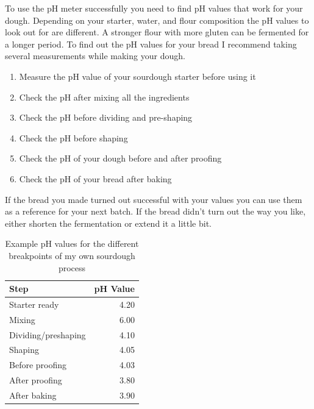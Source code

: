 To use the pH meter successfully you need to find pH values
that work for your dough. Depending on your starter,
water, and flour composition the pH values to look out
for are different. A stronger flour with more gluten
can be fermented for a longer period. To find out
the pH values for your bread I recommend taking
several measurements while making your dough.

\begin{enumerate}
  \item Measure the pH value of your sourdough starter before using it
  \item Check the pH after mixing all the ingredients
  \item Check the pH before dividing and pre-shaping
  \item Check the pH before shaping
  \item Check the pH of your dough before and after proofing
  \item Check the pH of your bread after baking
\end{enumerate}

If the bread you made turned out successful with your values
you can use them as a reference for your next batch. If the
bread didn't turn out the way you like, either shorten
the fermentation or extend it a little bit.

\begin{table}[!htb]
  \begin{tabular}{|l|r|}
  \hline
  \textbf{Step}       & \multicolumn{1}{l|}{\textbf{pH Value}} \\ \hline
  Starter ready       & 4.20                                   \\ \hline
  Mixing              & 6.00                                   \\ \hline
  Dividing/preshaping & 4.10                                   \\ \hline
  Shaping             & 4.05                                   \\ \hline
  Before proofing     & 4.03                                   \\ \hline
  After proofing      & 3.80                                   \\ \hline
  After baking        & 3.90                                   \\ \hline
  \end{tabular}
  \caption{Example pH values for the different breakpoints of my own sourdough process}
  \label{table:sample-ph-values}
\end{table}

